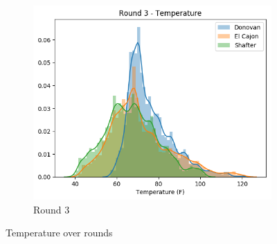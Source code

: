 \documentclass[journal abbreviation, manuscript]{copernicus}
\begin{document}
\begin{figure}[H]
\begin{subfigure}{0.32\textwidth}
\includegraphics[width=\textwidth]{results/distributions/round3_temperature.png}
\caption{Round 3}
\end{subfigure}
\caption{Temperature over rounds}
\label{fig:temperature-rounds}
\end{figure}
\end{document}
